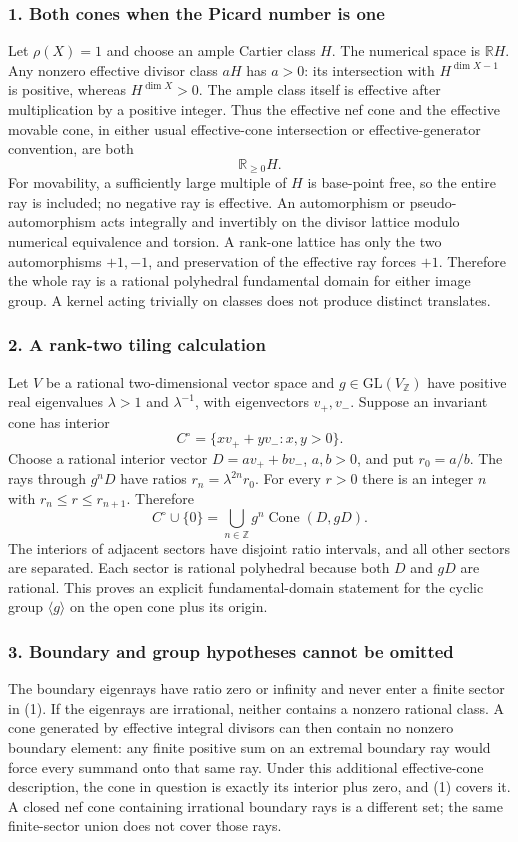 \documentclass[11pt]{article}
\begin{document}
\subsubsection{1. Both cones when the Picard number is one}
Let $\rho(X)=1$ and choose an ample Cartier class $H$. The numerical space is $\mathbb RH$. Any nonzero effective divisor class $aH$ has $a>0$: its intersection with $H^{\dim X-1}$ is positive, whereas $H^{\dim X}>0$. The ample class itself is effective after multiplication by a positive integer. Thus the effective nef cone and the effective movable cone, in either usual effective-cone intersection or effective-generator convention, are both
\[\mathbb R_{\ge0}H.\]
For movability, a sufficiently large multiple of $H$ is base-point free, so the entire ray is included; no negative ray is effective. An automorphism or pseudo-automorphism acts integrally and invertibly on the divisor lattice modulo numerical equivalence and torsion. A rank-one lattice has only the two automorphisms $+1,-1$, and preservation of the effective ray forces $+1$. Therefore the whole ray is a rational polyhedral fundamental domain for either image group. A kernel acting trivially on classes does not produce distinct translates.

\subsubsection{2. A rank-two tiling calculation}
Let $V$ be a rational two-dimensional vector space and $g\in\mathrm{GL}(V_{\mathbb Z})$ have positive real eigenvalues $\lambda>1$ and $\lambda^{-1}$, with eigenvectors $v_+,v_-$. Suppose an invariant cone has interior
\[C^\circ=\{xv_++yv_-:x,y>0\}.\]
Choose a rational interior vector $D=av_++bv_-$, $a,b>0$, and put $r_0=a/b$. The rays through $g^nD$ have ratios $r_n=\lambda^{2n}r_0$. For every $r>0$ there is an integer $n$ with $r_n\le r\le r_{n+1}$. Therefore
\[C^\circ\cup\{0\}=\bigcup_{n\in\mathbb Z}g^n\operatorname{Cone}(D,gD).\tag{1}\]
The interiors of adjacent sectors have disjoint ratio intervals, and all other sectors are separated. Each sector is rational polyhedral because both $D$ and $gD$ are rational. This proves an explicit fundamental-domain statement for the cyclic group $\langle g\rangle$ on the open cone plus its origin.

\subsubsection{3. Boundary and group hypotheses cannot be omitted}
The boundary eigenrays have ratio zero or infinity and never enter a finite sector in (1). If the eigenrays are irrational, neither contains a nonzero rational class. A cone generated by effective integral divisors can then contain no nonzero boundary element: any finite positive sum on an extremal boundary ray would force every summand onto that same ray. Under this additional effective-cone description, the cone in question is exactly its interior plus zero, and (1) covers it. A closed nef cone containing irrational boundary rays is a different set; the same finite-sector union does not cover those rays.
\end{document}
